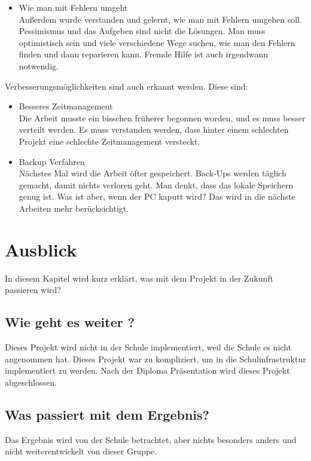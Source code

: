 \begin{itemize}
	\item Wie man mit Fehlern umgeht \\
	
	Außerdem wurde verstanden und gelernt, wie man mit Fehlern umgehen soll. Pessimismus und das Aufgeben sind nicht die Lösungen. Man muss optimistisch sein und viele verschiedene Wege suchen, wie man den Fehlern finden und dann reparieren kann. Fremde Hilfe ist auch irgendwann notwendig.
\end{itemize}	
	 Verbesserungsmöglichkeiten sind auch erkannt werden. Diese sind: 
\begin{itemize}	
	
	\item Besseres Zeitmanagement \\
	
	Die Arbeit musste ein bisschen früherer begonnen worden, und es muss besser verteilt werden. Es muss verstanden werden, dass hinter einem schlechten Projekt eine schlechte Zeitmanagement versteckt.
	
	\item Backup Verfahren \\
	
	Nächstes Mal wird die Arbeit öfter gespeichert. Back-Ups werden täglich gemacht, damit nichts verloren geht. Man denkt, dass das lokale Speichern genug ist. Was ist aber, wenn der PC kaputt wird? Das wird in die nächste Arbeiten mehr berücksichtigt.
\end{itemize}


\newpage 
\section{Ausblick}
In diesem Kapitel wird kurz erkl\"art, was mit dem Projekt in der Zukunft passieren wird?
\subsection{Wie geht es weiter ?}
Dieses Projekt wird nicht in der Schule implementiert, weil die Schule es nicht angenommen hat. Dieses Projekt war zu kompliziert, um in die Schulinfrastruktur implementiert zu werden. Nach der Diploma Präsentation wird dieses Projekt abgeschlossen.
\subsection{Was passiert mit dem Ergebnis?}
Das Ergebnis wird von der Schule betrachtet, aber nichts besonders anders und nicht weiterentwickelt von dieser Gruppe.
